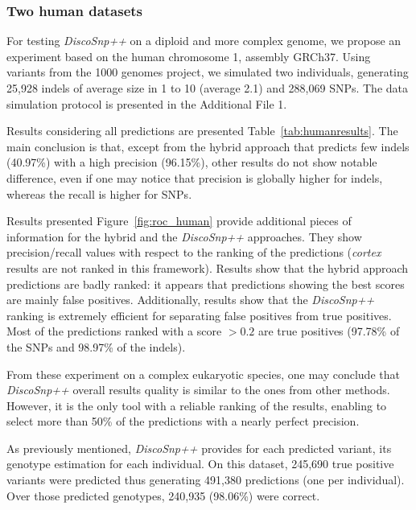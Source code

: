 \documentclass{bmcart}
\newcommand{\discopp}{{\it DiscoSnp++}\xspace}
\newcommand{\co}{{\it cortex}\xspace}
\begin{document}
\subsubsection*{Two human datasets}
\label{ssec:twohumans}
For testing \discopp on a diploid and more complex genome, we propose an experiment based on the human chromosome 1, assembly GRCh37. Using variants from the 1000 genomes project, we simulated two individuals, generating 25,928 indels of average size in 1 to 10 (average 2.1) and 288,069 SNPs.
The data simulation protocol is presented in the Additional File 1. 

Results 
considering all predictions are presented Table~\ref{tab:humanresults}. 
The main conclusion is that, except from the hybrid approach that predicts few indels (40.97\%) with a high precision (96.15\%), other results do not show  notable difference, even if one may notice that precision is globally higher for indels, whereas the recall is higher for SNPs. 

Results presented Figure~\ref{fig:roc_human} provide additional pieces of information for the hybrid and the \discopp approaches. They show precision/recall values with respect to the ranking of the predictions (\co results are not ranked in this framework). Results show that the hybrid approach predictions are badly ranked: it appears that predictions showing the best scores are mainly false positives. Additionally, results show that the \discopp ranking is extremely efficient for separating false positives from true positives. Most of the predictions ranked with a score $>0.2$ are true positives (97.78\%  of the SNPs and 98.97\% of the indels). 

From these experiment on a complex eukaryotic species, one may conclude that \discopp overall results quality is similar to the ones from other methods. However, it is the only tool with a reliable ranking of the results, enabling to select more than 50\% of the predictions with a nearly perfect precision.

As previously mentioned, \discopp provides for each predicted variant, its genotype estimation for each individual. On this dataset, 245,690 true positive variants were predicted thus generating 491,380 predictions (one per individual). Over those predicted genotypes, 240,935 (98.06\%) were correct. 
\end{document}

